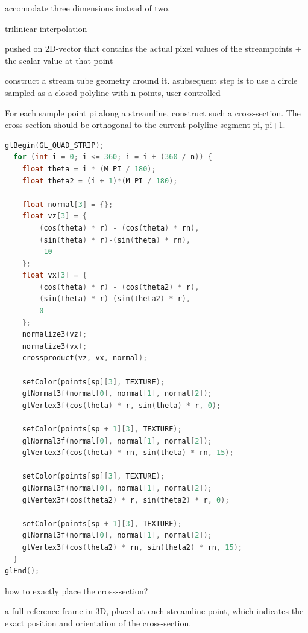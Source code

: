  
 accomodate three dimensions instead of two.
 
 triliniear interpolation
    
    
pushed on 2D-vector that contains the actual pixel values of the streampoints + the scalar value at that point




  
  construct a stream tube geometry around it. 
  asubsequent step is to use a circle sampled as a closed polyline with n points, user-controlled

   For each sample point pi along a streamline, construct such a cross-section. The cross-section should be orthogonal to the current polyline segment pi, pi+1.

  
\begin{lstlisting}[language=C,caption={Cross-section in 3D reference frame}]
glBegin(GL_QUAD_STRIP);
  for (int i = 0; i <= 360; i = i + (360 / n)) {
    float theta = i * (M_PI / 180);
    float theta2 = (i + 1)*(M_PI / 180);
    
    float normal[3] = {};
    float vz[3] = {
        (cos(theta) * r) - (cos(theta) * rn),
        (sin(theta) * r)-(sin(theta) * rn),
         10 
    };
    float vx[3] = {
        (cos(theta) * r) - (cos(theta2) * r),
        (sin(theta) * r)-(sin(theta2) * r),
        0
    };
    normalize3(vz);
    normalize3(vx);
    crossproduct(vz, vx, normal);

    setColor(points[sp][3], TEXTURE);
    glNormal3f(normal[0], normal[1], normal[2]);
    glVertex3f(cos(theta) * r, sin(theta) * r, 0);

    setColor(points[sp + 1][3], TEXTURE);
    glNormal3f(normal[0], normal[1], normal[2]);
    glVertex3f(cos(theta) * rn, sin(theta) * rn, 15);

    setColor(points[sp][3], TEXTURE);
    glNormal3f(normal[0], normal[1], normal[2]);
    glVertex3f(cos(theta2) * r, sin(theta2) * r, 0);

    setColor(points[sp + 1][3], TEXTURE);
    glNormal3f(normal[0], normal[1], normal[2]);
    glVertex3f(cos(theta2) * rn, sin(theta2) * rn, 15);
  }
glEnd();
\end{lstlisting}  
  
 
 
 how to exactly place the cross-section? 
 
 a full reference frame in 3D, placed at each streamline point, which indicates the exact position and orientation of the cross-section. 
 
